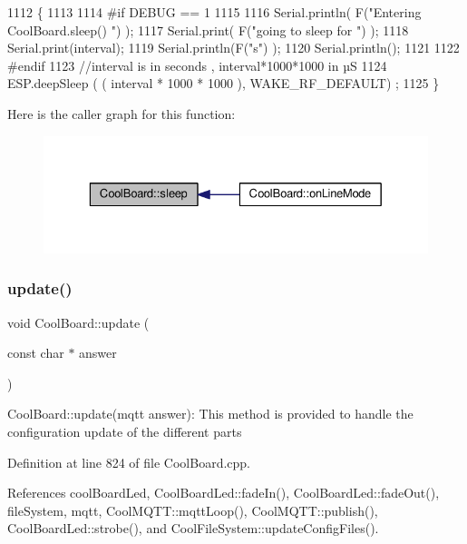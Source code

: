 \begin{DoxyCode}
1112 \{
1113 
1114 \textcolor{preprocessor}{#if DEBUG == 1}
1115 
1116     Serial.println( F(\textcolor{stringliteral}{"Entering CoolBoard.sleep() "}) );
1117     Serial.print( F(\textcolor{stringliteral}{"going to sleep for "}) );
1118     Serial.print(interval);
1119     Serial.println(F(\textcolor{stringliteral}{"s"}) );
1120     Serial.println();
1121 
1122 \textcolor{preprocessor}{#endif}
1123     \textcolor{comment}{//interval is in seconds , interval*1000*1000 in µS}
1124     ESP.deepSleep ( ( interval * 1000 * 1000 ), WAKE\_RF\_DEFAULT) ;
1125 \}
\end{DoxyCode}
Here is the caller graph for this function\+:
\nopagebreak
\begin{figure}[H]
\begin{center}
\leavevmode
\includegraphics[width=329pt]{classCoolBoard_a069952cdcb2e7f68518aa429eceadb6e_icgraph}
\end{center}
\end{figure}
\mbox{\label{classCoolBoard_a8612756d3f73198cdde857a66f0fe690}} 
\subsubsection{\texorpdfstring{update()}{update()}}
{\footnotesize\ttfamily void Cool\+Board\+::update (\begin{DoxyParamCaption}\item[{const char $\ast$}]{answer }\end{DoxyParamCaption})}

Cool\+Board\+::update(mqtt answer)\+: This method is provided to handle the configuration update of the different parts 

Definition at line 824 of file Cool\+Board.\+cpp.



References cool\+Board\+Led, Cool\+Board\+Led\+::fade\+In(), Cool\+Board\+Led\+::fade\+Out(), file\+System, mqtt, Cool\+M\+Q\+T\+T\+::mqtt\+Loop(), Cool\+M\+Q\+T\+T\+::publish(), Cool\+Board\+Led\+::strobe(), and Cool\+File\+System\+::update\+Config\+Files().



